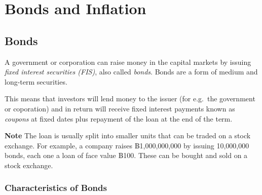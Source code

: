 \documentclass[
]{book}
\theoremstyle{definition}
\theoremstyle{definition}
\theoremstyle{definition}
\theoremstyle{definition}
\theoremstyle{remark}
\begin{document}
\hypertarget{bonds-and-inflation}{%
\chapter{Bonds and Inflation}\label{bonds-and-inflation}}

\hypertarget{bonds}{%
\section{Bonds}\label{bonds}}

A government or corporation can raise money in the capital markets by
issuing \emph{fixed interest securities (FIS)}, also called \emph{bonds}. Bonds
are a form of medium and long-term securities.

This means that investors will lend money to the issuer (for e.g.~the
government or coporation) and in return will receive fixed interest
payments known as \emph{coupons} at fixed dates plus repayment of the loan at
the end of the term.

\textbf{Note} The loan is usually split into smaller units that can be traded
on a stock exchange. For example, a company raises ฿1,000,000,000 by
issuing 10,000,000 bonds, each one a loan of face value ฿100. These can
be bought and sold on a stock exchange.

\hypertarget{characteristics-of-bonds}{%
\subsection{Characteristics of Bonds}\label{characteristics-of-bonds}}
\end{document}
